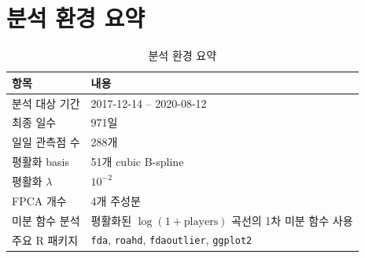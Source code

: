 \documentclass[11pt,a4paper]{article}
\begin{document}
\section{분석 환경 요약}
\begin{table}[H]
\centering
\caption{분석 환경 요약}
\begin{tabular}{ll}
\toprule
항목 & 내용 \\
\midrule
분석 대상 기간 & 2017-12-14 -- 2020-08-12 \\
최종 일수 & 971일 \\
일일 관측점 수 & 288개 \\
평활화 basis & 51개 cubic B-spline \\
평활화 $\lambda$ & $10^{-2}$ \\
FPCA 개수 & 4개 주성분 \\
미분 함수 분석 & 평활화된 $\log(1+\mathrm{players})$ 곡선의 1차 미분 함수 사용 \\
주요 R 패키지 & \texttt{fda}, \texttt{roahd}, \texttt{fdaoutlier}, \texttt{ggplot2} \\
\bottomrule
\end{tabular}
\end{table}
\end{document}
